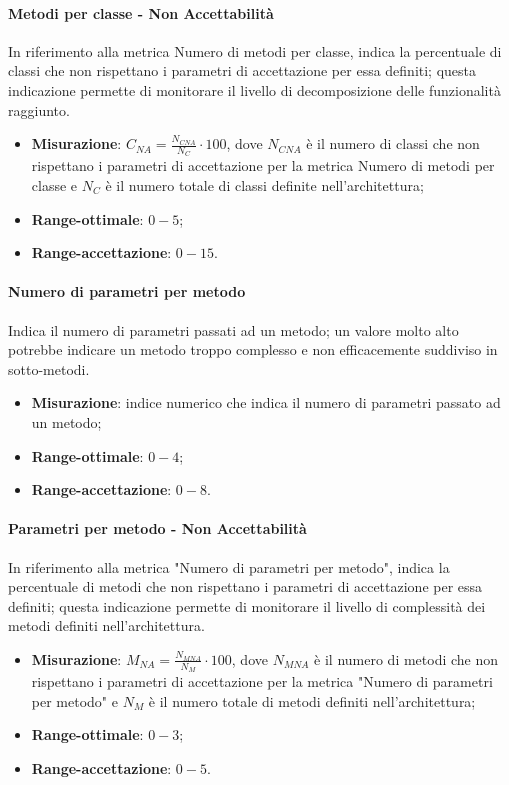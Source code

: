 \paragraph{Metodi per classe - Non Accettabilità}
\label{numMetodiClasseNA}
In riferimento alla metrica Numero di metodi per classe, indica la percentuale di classi che non rispettano i parametri di accettazione per essa definiti; questa indicazione permette di monitorare il livello di decomposizione delle funzionalità raggiunto.
\begin{itemize}
\item \textbf{Misurazione}: $C_{NA}=\frac{N_{CNA}}{N_{C}} \cdot 100$, dove $N_{CNA}$ è il numero di classi che non rispettano i parametri di accettazione per la metrica Numero di metodi per classe e $N_{C}$ è il numero totale di classi definite nell'architettura;
\item \textbf{Range-ottimale}: $0 - 5$;
\item \textbf{Range-accettazione}: $0 - 15$.
\end{itemize}
\paragraph{Numero di parametri per metodo}
Indica il numero di parametri passati ad un metodo; un valore molto alto potrebbe indicare un metodo troppo complesso e non efficacemente suddiviso in sotto-metodi.
\begin{itemize}
\item \textbf{Misurazione}: indice numerico che indica il numero di parametri passato ad un metodo;
\item \textbf{Range-ottimale}: $0 - 4$;
\item \textbf{Range-accettazione}: $0 - 8$.
\end{itemize}
\paragraph{Parametri per metodo - Non Accettabilità}
\label{numParMetodoNA}
In riferimento alla metrica "Numero di parametri per metodo", indica la percentuale di metodi che non rispettano i parametri di accettazione per essa definiti; questa indicazione permette di monitorare il livello di complessità dei metodi definiti nell'architettura.
\begin{itemize}
\item \textbf{Misurazione}: $M_{NA}=\frac{N_{MNA}}{N_{M}} \cdot 100$, dove $N_{MNA}$ è il numero di metodi che non rispettano i parametri di accettazione per la metrica "Numero di parametri per metodo" e $N_{M}$ è il numero totale di metodi definiti nell'architettura;
\item \textbf{Range-ottimale}: $0 - 3$;
\item \textbf{Range-accettazione}: $0 - 5$.
\end{itemize}

